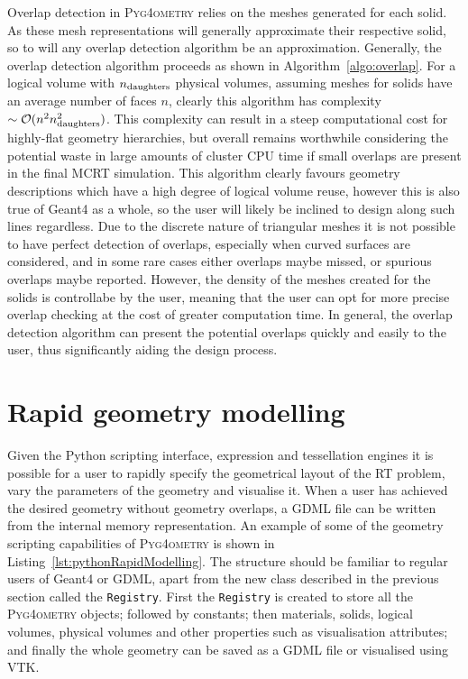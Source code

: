 \documentclass[preprint,12pt]{elsarticle}
\newcommand{\PYGEOMETRY}{\textsc{Pyg4ometry}}
\begin{document}
Overlap detection in \PYGEOMETRY{} relies on the meshes generated for each solid.  As
these mesh representations will generally approximate their respective solid,
so to will any overlap detection algorithm be an approximation. Generally, the overlap detection
algorithm proceeds as shown in Algorithm~\ref{algo:overlap}.
For a logical volume with $n_{\rm daughters}$ physical volumes, assuming meshes for solids have an average number of faces $n$, clearly this algorithm
has complexity $\sim \mathcal{O}(n^2 n_{\rm daughters}^2)$. This complexity
can result in a steep computational cost for highly-flat geometry
hierarchies, but overall remains worthwhile considering the potential
waste in large amounts of cluster CPU time if small overlaps are present in the final MCRT simulation. This algorithm clearly favours geometry
descriptions which have a high degree of logical volume reuse, however this is also true of Geant4 as a whole, so the user will likely be inclined to design along such lines regardless.
Due to the discrete nature of triangular meshes it is not possible to have perfect detection
of overlaps, especially when curved surfaces are considered, and in some rare
cases either overlaps maybe missed, or spurious overlaps maybe reported.  However, the density of the meshes
created for the solids is controllabe by the user, meaning that the user
can opt for more precise overlap checking at the cost of greater
computation time.  In general, the overlap detection algorithm can
present the potential overlaps quickly and easily to the user, thus
significantly aiding the design process.

\section{Rapid geometry modelling}
Given the Python scripting interface, expression  and tessellation engines it is possible for a user to rapidly specify the geometrical layout of the RT problem, vary
the parameters of the geometry and visualise it.  When a user has achieved the desired geometry without geometry overlaps, a GDML file can be written
from the internal memory representation. An example of some of the geometry scripting capabilities of \PYGEOMETRY{} is shown in Listing~\ref{lst:pythonRapidModelling}. The structure should be familiar to regular
users of Geant4 or GDML, apart from the new class described in the previous section called the \verb|Registry|. First the \verb|Registry| is created to store all
the \PYGEOMETRY{} objects; followed by constants;  then materials, solids, logical volumes, physical volumes and other properties such as visualisation attributes; and finally the whole geometry can be saved
as a GDML file or visualised using VTK.
\end{document}
